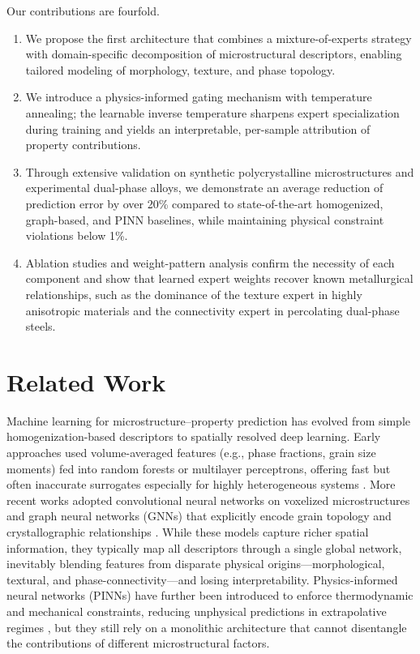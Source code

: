 \documentclass{article}
\begin{document}
Our contributions are fourfold.
\begin{enumerate}
    \item We propose the first architecture that combines a mixture-of-experts strategy with domain-specific decomposition of microstructural descriptors, enabling tailored modeling of morphology, texture, and phase topology.
    \item We introduce a physics-informed gating mechanism with temperature annealing; the learnable inverse temperature sharpens expert specialization during training and yields an interpretable, per-sample attribution of property contributions.
    \item Through extensive validation on synthetic polycrystalline microstructures and experimental dual-phase alloys, we demonstrate an average reduction of prediction error by over 20\% compared to state-of-the-art homogenized, graph-based, and PINN baselines, while maintaining physical constraint violations below 1\%.
    \item Ablation studies and weight-pattern analysis confirm the necessity of each component and show that learned expert weights recover known metallurgical relationships, such as the dominance of the texture expert in highly anisotropic materials and the connectivity expert in percolating dual-phase steels.
\end{enumerate}

\section{Related Work}

Machine learning for microstructure--property prediction has evolved from simple homogenization-based descriptors to spatially resolved deep learning. Early approaches used volume-averaged features (e.g., phase fractions, grain size moments) fed into random forests or multilayer perceptrons, offering fast but often inaccurate surrogates especially for highly heterogeneous systems \cite{cecchini_homogenization_ml_2015, bostanabad_descriptor_2018}. More recent works adopted convolutional neural networks on voxelized microstructures \cite{yang_voxel_cnn_2019, rao_3d_cnn_materials_2020} and graph neural networks (GNNs) that explicitly encode grain topology and crystallographic relationships \cite{kovalenko_gnn_microstructure_2021, shilt_graph_property_2022}. While these models capture richer spatial information, they typically map all descriptors through a single global network, inevitably blending features from disparate physical origins—morphological, textural, and phase-connectivity—and losing interpretability. Physics-informed neural networks (PINNs) have further been introduced to enforce thermodynamic and mechanical constraints, reducing unphysical predictions in extrapolative regimes \cite{mianroodi_pinn_damage_2021, heidenreich_phys_constraints_2023}, but they still rely on a monolithic architecture that cannot disentangle the contributions of different microstructural factors.
\end{document}
